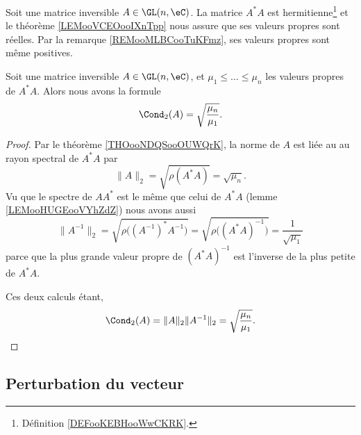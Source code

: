 Soit une matrice inversible \( A\in \GL(n,\eC)\). La matrice \( A^*A\) est hermitienne\footnote{Définition \ref{DEFooKEBHooWwCKRK}.} et le théorème \ref{LEMooVCEOooIXnTpp} nous assure que ses valeurs propres sont réelles. Par la remarque \ref{REMooMLBCooTuKFmz}, ses valeurs propres sont même positives.
\begin{proposition}      \label{PROPooNUAUooIbVgcN}
    Soit une matrice inversible \( A\in\GL(n,\eC)\), et \( \mu_1\leq\ldots\leq \mu_n\) les valeurs propres de \( A^*A\). Alors nous avons la formule
    \begin{equation}
        \Cond_2(A)=\sqrt{ \frac{ \mu_n }{ \mu_1 }}.
    \end{equation}
\end{proposition}

\begin{proof}
    Par le théorème \ref{THOooNDQSooOUWQrK}, la norme de \( A\) est liée au au rayon spectral de \( A^*A\) par
    \begin{equation}
        \| A \|_2=\sqrt{ \rho(A^*A) }=\sqrt{ \mu_n }.
    \end{equation}
    Vu que le spectre de \( AA^*\) est le même que celui de \( A^*A\) (lemme \ref{LEMooHUGEooVYhZdZ}) nous avons aussi
    \begin{equation}
        \| A^{-1} \|_2=\sqrt{ \rho\big( (A^{-1})^*A^{-1} \big) }=\sqrt{ \rho\big( (A^*A)^{-1} \big) }=\frac{1}{ \sqrt{ \mu_1 } }
    \end{equation}
    parce que la plus grande valeur propre de \( (A^*A)^{-1}\) est l'inverse de la plus petite de \( A^*A\).

    Ces deux calculs étant,
    \begin{equation}
        \Cond_2(A)=\| A \|_2\| A^{-1} \|_2=\sqrt{ \frac{ \mu_n }{ \mu_1 } }.
    \end{equation}
\end{proof}

\subsection{Perturbation du vecteur}

